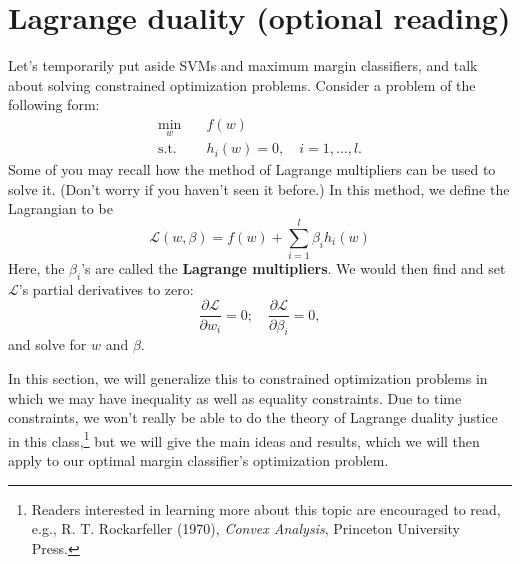 \section{Lagrange duality (optional reading)}
Let's temporarily put aside SVMs and maximum margin classifiers, and talk
about solving constrained optimization problems.
Consider a problem of the following form:
\begin{align*} %
    \min_w \quad& f(w)\\
    \operatorname{s.t.} \quad& h_i (w) = 0, \quad i = 1,\ldots,l.    
\end{align*}
Some of you may recall how the method of Lagrange multipliers can be used
to solve it. (Don't worry if you haven't seen it before.) In this method, we
define the Lagrangian to be{}
\begin{equation*}
    \mathcal L(w,\beta) = f(w) + \sum_{i=1}^l \beta_i h_i (w)
\end{equation*}
Here, the $\beta_i$'s are called the \textbf{Lagrange multipliers}. We would then find
and set $\mathcal{L}$'s partial derivatives to zero:
\begin{equation*}
    \frac{\partial \mathcal L}{\partial w_i} = 0; \quad \frac{\partial \mathcal L}{\partial \beta_i} = 0,    
\end{equation*}
and solve for $w$ and $\beta$.

In this section, we will generalize this to constrained optimization problems
in which we may have inequality as well as equality constraints. Due to
time constraints, we won't really be able to do the theory of Lagrange duality
justice in this class,\footnote{%
Readers interested in learning more about this topic are encouraged to read, e.g., R.
T. Rockarfeller (1970), \textit{Convex Analysis}, Princeton University Press.
} but we will give the main ideas and results, which we
will then apply to our optimal margin classifier's optimization problem.

